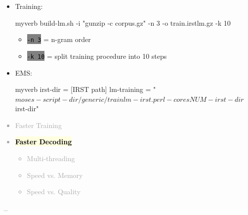 \documentclass[landscape]{uedslides2C}
\newcommand{\currenttopic}[1]{\colorbox{lightyellow}{\textcolor{black}{\bf #1}}}
\newcommand{\littlecode}[1]{\colorbox{gray}{\textcolor{black}{\small \tt #1}}}
\begin{document}

\begin{itemize}

\item Training: \\[3mm]
\begin{SaveVerbatim}{myverb} 
build-lm.sh -i "gunzip -c corpus.gz" -n 3 
      -o train.irstlm.gz -k 10
\end{SaveVerbatim}
\colorbox{gray}{}

\begin{itemize}
\item \littlecode{-n 3} = n-gram order
\item \littlecode{-k 10} = split training procedure into 10 steps
\end{itemize}

\item EMS:  \\[3mm]
  \begin{SaveVerbatim}{myverb} 
  irst-dir = [IRST path]
  lm-training = "$moses-script-dir/generic/trainlm-irst.perl 
		  -cores NUM -irst-dir $irst-dir"
  \end{SaveVerbatim}
  \colorbox{gray}{}

\end{itemize}


\vspace{-5mm}
\textcolor{darkgrey}{
\begin{itemize} \itemsep -1mm
\item {Faster Training}
\item \currenttopic{Faster Decoding}
  \begin{itemize}
  \item Multi-threading
  \item Speed vs. Memory
  \item Speed vs. Quality
  \end{itemize}
\end{itemize}
\ldots
}

\end{document}
